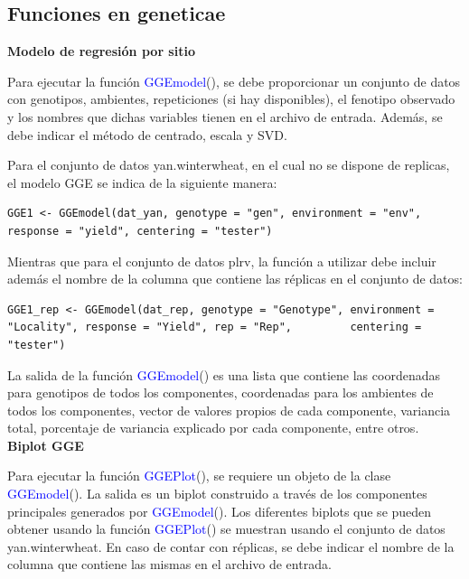 \subsection{Funciones en geneticae}

\textbf{Modelo de regresión por sitio}

Para ejecutar la función \textcolor{blue}{GGEmodel}(), se debe proporcionar un conjunto de datos con genotipos, ambientes, repeticiones (si hay disponibles), el fenotipo observado y los nombres que dichas variables tienen en el archivo de entrada. Además, se debe indicar el método de centrado, escala y SVD. 

Para el conjunto de datos yan.winterwheat, en el cual no se dispone de replicas, el modelo GGE se indica de la siguiente manera:
		\begin{tcolorbox}[colframe=aurometalsaurus,colback=backcolour,colbacklower=white,
   				width=1\linewidth,
    			height=0.1\linewidth,
    			boxsep=-3mm]
			\begin{lstlisting}
GGE1 <- GGEmodel(dat_yan, genotype = "gen", environment = "env", response = "yield", centering = "tester")
			\end{lstlisting}
		\end{tcolorbox}
Mientras que para el conjunto de datos plrv, la función a utilizar debe incluir además el nombre de la columna que contiene las réplicas en el conjunto de datos:

		\begin{tcolorbox}[colframe=aurometalsaurus,colback=backcolour,colbacklower=white,
   				width=1\linewidth,
    			height=0.1\linewidth,
    			boxsep=-3mm]
			\begin{lstlisting}
GGE1_rep <- GGEmodel(dat_rep, genotype = "Genotype", environment = "Locality", response = "Yield", rep = "Rep", 		centering = "tester")
			\end{lstlisting}
		\end{tcolorbox}

La salida de la función \textcolor{blue}{GGEmodel}() es una lista que contiene las coordenadas para genotipos de todos los componentes, coordenadas para los ambientes de todos los componentes, vector de valores propios de cada componente, variancia total, porcentaje de variancia explicado por cada componente, entre otros.\\

\textbf{Biplot GGE}

Para ejecutar la función \textcolor{blue}{GGEPlot}(), se requiere un objeto de la clase \textcolor{blue}{GGEmodel}(). La salida es un biplot construido a través de los componentes principales generados por \textcolor{blue}{GGEmodel}().
Los diferentes biplots que se pueden obtener usando la función \textcolor{blue}{GGEPlot}() se muestran usando el conjunto de datos yan.winterwheat. En caso de contar con réplicas, se debe indicar el nombre de la columna que contiene las mismas en el archivo de entrada.

